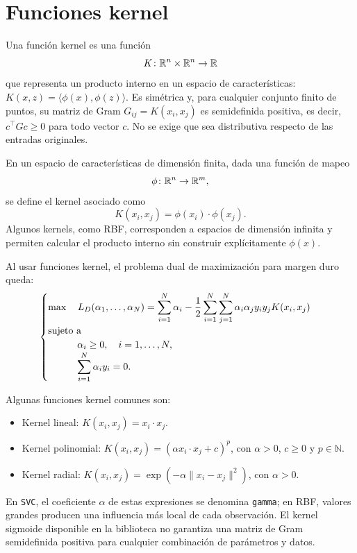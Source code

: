\documentclass[a4,11pt]{aleph-notas}
\begin{document}
\section{Funciones kernel}

\begin{defi}
    Una función kernel es una función $$K\colon \mathbb{R}^n \times \mathbb{R}^n \rightarrow \mathbb{R}$$ que representa un producto interno en un espacio de características: $K(x,z)=\langle\phi(x),\phi(z)\rangle$. Es simétrica y, para cualquier conjunto finito de puntos, su matriz de Gram $G_{ij}=K(x_i,x_j)$ es semidefinida positiva, es decir, $c^\top Gc\geq 0$ para todo vector $c$. No se exige que sea distributiva respecto de las entradas originales.
\end{defi}

\begin{advertencia}
    En un espacio de características de dimensión finita, dada una función de mapeo $$\phi\colon \mathbb{R}^n \rightarrow \mathbb{R}^m,$$ se define el kernel asociado como $$K({x}_i, {x}_j) = \phi({x}_i) \cdot \phi({x}_j).$$ Algunos kernels, como RBF, corresponden a espacios de dimensión infinita y permiten calcular el producto interno sin construir explícitamente $\phi(x)$.
\end{advertencia}

Al usar funciones kernel, el problema dual de maximización para margen duro queda:
\[
    \begin{cases}
        \max \quad \displaystyle L_D({\alpha_1},\ldots,\alpha_N) = \sum_{i=1}^N \alpha_i - \frac{1}{2} \sum_{i=1}^N \sum_{j=1}^N \alpha_i \alpha_j y_i y_j K({x}_i, {x}_j) \\
        \text{sujeto a}\\ 
        \qquad\quad \alpha_i \geq 0, \quad i = 1,\ldots, N,\\
        \qquad\quad \displaystyle\sum_{i=1}^N \alpha_i y_i = 0.
    \end{cases}
\]

Algunas funciones kernel comunes son:
\begin{itemize}
    \item Kernel lineal: $K({x}_i, {x}_j) = {x}_i \cdot {x}_j$.
    \item Kernel polinomial: $K({x}_i, {x}_j) = (\alpha {x}_i \cdot {x}_j + c)^p$, con $\alpha > 0$, $c \geq 0$ y $p \in \mathbb{N}$.
    \item Kernel radial: $K({x}_i, {x}_j) = \exp\left(-\alpha \|{x}_i - {x}_j\|^2\right)$, con $\alpha > 0$.
\end{itemize}

En \texttt{SVC}, el coeficiente $\alpha$ de estas expresiones se denomina \texttt{gamma}; en RBF, valores grandes producen una influencia más local de cada observación. El kernel sigmoide disponible en la biblioteca no garantiza una matriz de Gram semidefinida positiva para cualquier combinación de parámetros y datos.
\end{document}
